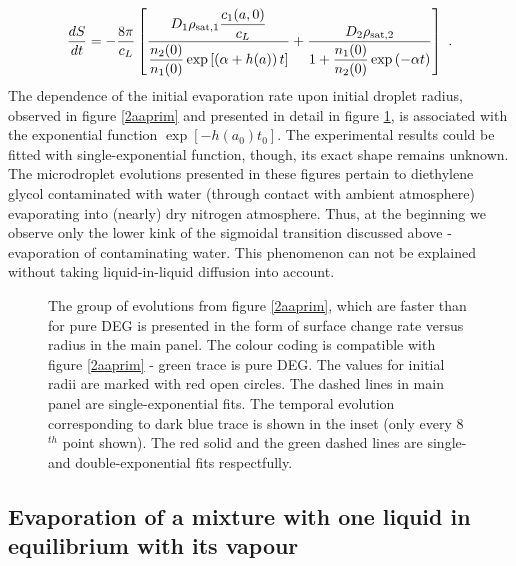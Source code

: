 \documentclass[twoside,twocolumn,9pt]{article}
\begin{document}
\begin{equation}
\frac{dS}{dt} = -\frac{8\pi}{c_L} \left[ \frac{D_1\rho_{{\rm sat},1}\dfrac{c_1(a,0)}{c_L} }{\dfrac{n_{2}(0)}{n_{1}(0)}\exp\left[\left(\alpha + h(a)\right) t\right]} + \dfrac{D_2\rho_{{\rm sat},2}}{1+\dfrac{n_{1}(0)}{n_{2}(0)}\exp\left(-\alpha t\right)} \right] \mbox{~.}
\label{combined}
\end{equation}
The dependence of the initial evaporation rate upon initial droplet radius, observed in figure \ref{2aaprim} and presented in detail in figure \ref{exp_a0}, is associated with the exponential function $\exp \left[ -h(a_0) t_0\right]$. The experimental results could be fitted with single-exponential function, though, its exact shape remains unknown. The microdroplet evolutions presented in these figures pertain to diethylene glycol contaminated with water (through contact with ambient atmosphere) evaporating into (nearly) dry nitrogen atmosphere. Thus, at the beginning we observe only the lower kink of the sigmoidal transition discussed above - evaporation of contaminating water. This phenomenon can not be explained without taking liquid-in-liquid diffusion into account.
\begin{figure}[htb]
 \centering
 \caption{The group of evolutions from figure \ref{2aaprim}, which are faster than for pure DEG is presented in the form of surface change rate versus radius in the main panel. The colour coding is compatible with figure \ref{2aaprim} - green trace is pure DEG. The values for initial radii are marked with red open circles. The dashed lines in main panel are single-exponential fits. The temporal evolution corresponding to dark blue trace is shown in the inset (only every 8$^{th}$ point shown). The red solid and the green dashed lines are single- and double-exponential fits respectfully.}
 \label{exp_a0}
\end{figure}

\subsection{Evaporation of a mixture with one liquid in equilibrium with its vapour} \label{in-equilibrium}
\end{document}
